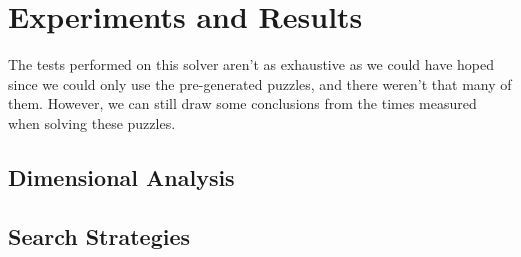 \documentclass[runningheads]{llncs}
\begin{document}
\section{Experiments and Results}
The tests performed on this solver aren't as exhaustive as we could have hoped since
    we could only use the pre-generated puzzles, and there weren't that many of them.
However, we can still draw some conclusions from the times measured when solving these puzzles.

\subsection{Dimensional Analysis}

\subsection{Search Strategies}
\end{document}
